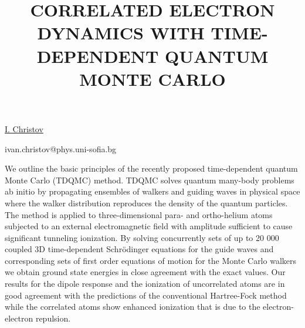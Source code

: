 \title{CORRELATED ELECTRON DYNAMICS WITH TIME-DEPENDENT QUANTUM MONTE CARLO}

\underline{I. Christov} 

{\normalsize{\vspace{-4mm} \unisofia

\email ivan.christov@phys.uni-sofia.bg}}

We outline the basic principles of the recently proposed time-dependent
quantum Monte Carlo (TDQMC) method. TDQMC solves quantum many-body problems
ab initio by propagating ensembles of walkers and guiding waves in physical
space where the walker distribution reproduces the density of the quantum
particles. The method is applied to three-dimensional para- and
ortho-helium atoms subjected to an external electromagnetic field with
amplitude sufficient to cause significant tunneling ionization. By solving
concurrently sets of up to 20 000 coupled 3D time-dependent Schr\"{o}dinger
equations for the guide waves and corresponding sets of first order
equations of motion for the Monte Carlo walkers we obtain ground state
energies in close agreement with the exact values. Our results for the
dipole response and the ionization of uncorrelated atoms are in good
agreement with the predictions of the conventional Hartree-Fock method
while the correlated atoms show enhanced ionization that is due to the
electron-electron repulsion.

\vspace{\baselineskip} 